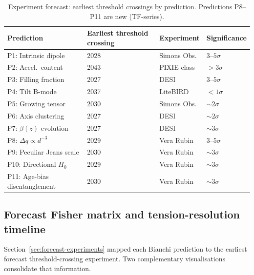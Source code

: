 \begin{table}[t]
\centering
\caption{Experiment forecast: earliest threshold crossings by prediction.
Predictions P8--P11 are new (TF-series).}
\label{tab:forecast}
\footnotesize
\begin{tabular}{llll}
\toprule
Prediction & Earliest threshold crossing & Experiment & Significance \\
\midrule
P1: Intrinsic dipole & 2028 & Simons Obs. & $3$--$5\sigma$ \\
P2: Accel.\ content & 2043 & PIXIE-class & $>3\sigma$ \\
P3: Filling fraction & 2027 & DESI & $3$--$5\sigma$ \\
P4: Tilt B-mode & 2037 & LiteBIRD & $<1\sigma$ \\
P5: Growing tensor & 2030 & Simons Obs. & $\sim 2\sigma$ \\
P6: Axis clustering & 2027 & DESI & $\sim 2\sigma$ \\
P7: $\beta(z)$ evolution & 2027 & DESI & $\sim 3\sigma$ \\
\midrule
P8: $\Delta q \propto d^{-3}$ & 2029 & Vera Rubin & $3$--$5\sigma$ \\
P9: Peculiar Jeans scale & 2030 & Vera Rubin & $\sim 3\sigma$ \\
P10: Directional $H_0$ & 2029 & Vera Rubin & $\sim 3\sigma$ \\
P11: Age-bias disentanglement & 2030 & Vera Rubin & $\sim 3\sigma$ \\
\bottomrule
\end{tabular}
\end{table}




\subsection{Forecast Fisher matrix and tension-resolution timeline}
\label{sec:forecast-fisher-and-timeline}

Section~\ref{sec:forecast-experiments} mapped each Bianchi
prediction to the earliest forecast threshold-crossing experiment.
Two complementary
visualisations consolidate that information.

